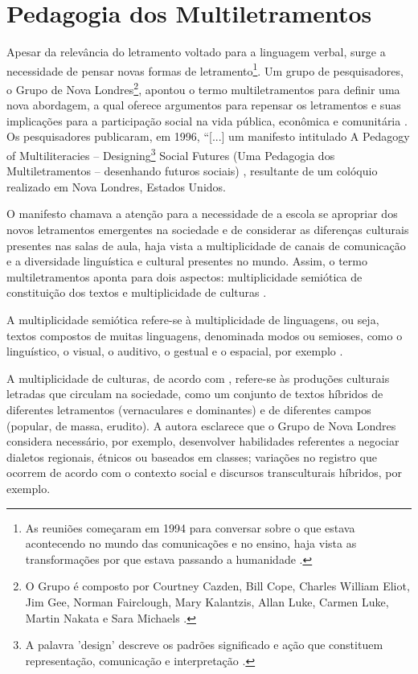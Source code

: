 \documentclass{textolivre}
\begin{document}
\section{Pedagogia dos Multiletramentos}\label{sec-pedagogia}
Apesar da relevância do letramento voltado para a linguagem verbal, surge a
necessidade de pensar novas formas de letramento\footnote{
As reuniões começaram em 1994 para conversar sobre o que estava acontecendo no
mundo das comunicações e no ensino, haja vista as transformações por que estava
passando a humanidade \cite{cope2009}.
}. Um grupo de pesquisadores, o Grupo de Nova Londres\footnote{
O Grupo é composto por Courtney Cazden, Bill Cope, Charles William Eliot, Jim
Gee, Norman Fairclough, Mary Kalantzis, Allan Luke, Carmen Luke, Martin Nakata
e Sara Michaels \cite{cope2009}.
}, apontou o termo multiletramentos para definir uma nova abordagem, a qual
oferece argumentos para repensar os letramentos e suas implicações para a
participação social na vida pública, econômica e comunitária \cite{cope2009}.
Os pesquisadores publicaram, em 1996, “[...] um manifesto intitulado A Pedagogy
of Multiliteracies – Designing\footnote{A palavra 'design' descreve os padrões
significado e ação que constituem representação, comunicação e interpretação
\cite{cope2009}.} Social Futures (Uma Pedagogia dos
Multiletramentos – desenhando futuros sociais) \cite[p. 12]{rojo2012}, resultante
de um colóquio realizado em Nova Londres, Estados Unidos.

O manifesto chamava a atenção para a necessidade de a escola se apropriar dos
novos letramentos emergentes na sociedade e de considerar as diferenças
culturais presentes nas salas de aula, haja vista a multiplicidade de canais de
comunicação e a diversidade linguística e cultural presentes no mundo. Assim, o
termo multiletramentos aponta para dois aspectos: multiplicidade semiótica de
constituição dos textos e multiplicidade de culturas \cite{rojo2012}.

A multiplicidade semiótica refere-se à multiplicidade de linguagens, ou seja,
textos compostos de muitas linguagens, denominada modos ou semioses, como o
linguístico, o visual, o auditivo, o gestual e o espacial, por exemplo \cite{cope2009}.

A multiplicidade de culturas, de acordo com \textcite{rojo2012}, refere-se às produções
culturais letradas que circulam na sociedade, como um conjunto de textos
híbridos de diferentes letramentos (vernaculares e dominantes) e de diferentes
campos (popular, de massa, erudito). A autora esclarece que o Grupo de Nova
Londres considera necessário, por exemplo, desenvolver habilidades referentes a
negociar dialetos regionais, étnicos ou baseados em classes; variações no
registro que ocorrem de acordo com o contexto social e discursos transculturais
híbridos, por exemplo.
\end{document}
